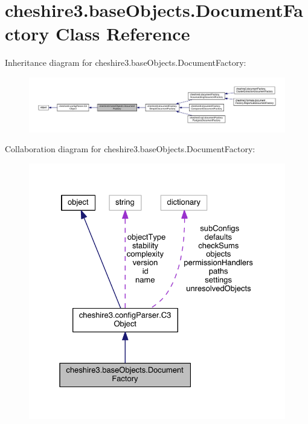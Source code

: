 \hypertarget{classcheshire3_1_1base_objects_1_1_document_factory}{\section{cheshire3.\-base\-Objects.\-Document\-Factory Class Reference}
\label{classcheshire3_1_1base_objects_1_1_document_factory}
}


Inheritance diagram for cheshire3.\-base\-Objects.\-Document\-Factory\-:
\nopagebreak
\begin{figure}[H]
\begin{center}
\leavevmode
\includegraphics[width=350pt]{classcheshire3_1_1base_objects_1_1_document_factory__inherit__graph}
\end{center}
\end{figure}


Collaboration diagram for cheshire3.\-base\-Objects.\-Document\-Factory\-:
\nopagebreak
\begin{figure}[H]
\begin{center}
\leavevmode
\includegraphics[width=327pt]{classcheshire3_1_1base_objects_1_1_document_factory__coll__graph}
\end{center}
\end{figure}
